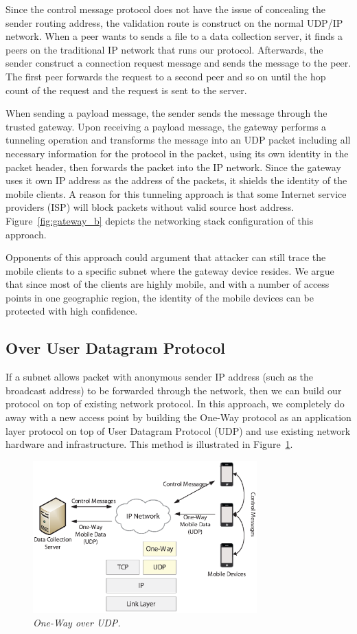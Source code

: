 Since the control message protocol does not have the issue of concealing
the sender routing address, the validation route is construct on the
normal UDP/IP network. When a peer wants to sends a file to a data
collection server, it finds a peers on the traditional IP network that
runs our protocol. Afterwards, the sender construct a connection request
message and sends the message to the peer. The first peer forwards the
request to a second peer and so on until the hop count of the request and
the request is sent to the server.

When sending a payload message, the sender sends the message through the
trusted gateway. Upon receiving a payload message, the gateway performs a
tunneling operation and transforms the message into an UDP packet including
all necessary information for the protocol in the packet, using its own
identity in the packet header, then forwards the packet into the IP network.
Since the gateway uses it own
IP address as the address of the packets, it shields the identity of the mobile
clients. A reason for this tunneling approach is that some Internet service
providers (ISP) will block packets without valid source host address.
Figure~\ref{fig:gateway_b}
depicts the networking stack configuration of this approach.

Opponents of this approach could argument that attacker can still
trace the mobile clients to a
specific subnet where the gateway device resides. We argue that since most of
the clients are highly mobile, and with a number of access points in one
geographic region, the identity of the mobile devices can be protected with high
confidence.

\subsection{Over User Datagram Protocol}
If a subnet allows packet with anonymous sender IP address (such as the
broadcast address) to be forwarded through the network, then we can build
our protocol on top of existing network protocol.
In this approach, we completely do away with a new access point by building
the One-Way protocol as an application layer protocol on top of User Datagram
Protocol (UDP) and use existing network hardware and infrastructure. This
method is illustrated in Figure~\ref{fig:imp-udp}.

\begin{figure}[h]
\begin{center}
\includegraphics[width=3.4in]{one-way-udp.eps}
\caption{\small \sl One-Way over UDP.\label{fig:imp-udp}}
\end{center}
\end{figure}

